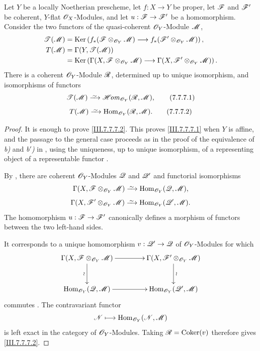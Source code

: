 \begin{corollary}[7.7.7]
\label{III.7.7.7}
Let $Y$ be a locally Noetherian prescheme, let
$f:X\to Y$ be proper, let $\mathscr{F}$ and $\mathscr{F}'$ be
coherent, $Y$-flat $\mathscr{O}_X$-Modules, and let
$u:\mathscr{F}\to\mathscr{F}'$ be a homomorphism.  Consider the two
functors of the quasi-coherent $\mathscr{O}_Y$-Module $\mathscr{M}$,
\begin{align*}
  \mathscr{T}(\mathscr{M})
  &=
  \operatorname{Ker}\left(
    f_*(\mathscr{F}\otimes_{\mathscr{O}_Y}\mathscr{M})
    \longrightarrow
    f_*(\mathscr{F}'\otimes_{\mathscr{O}_Y}\mathscr{M})
  \right),\\
  T(\mathscr{M})
  &=
  \Gamma(Y,\mathscr{T}(\mathscr{M}))\\
  &=
  \operatorname{Ker}\left(
    \Gamma(X,\mathscr{F}\otimes_{\mathscr{O}_Y}\mathscr{M})
    \longrightarrow
    \Gamma(X,\mathscr{F}'\otimes_{\mathscr{O}_Y}\mathscr{M})
  \right).
\end{align*}
There is a coherent $\mathscr{O}_Y$-Module $\mathscr{R}$, determined
up to unique isomorphism, and isomorphisms of functors
\[
  \sh{T}(\sh{M})
  \simto
  \shHom_{\sh{O}_Y}(\sh{R},\sh{M}),
  \tag{7.7.7.1}\label{III.7.7.7.1}
\]
\[
  T(\sh{M})
  \simto
  \Hom_{\sh{O}_Y}(\sh{R},\sh{M}).
  \tag{7.7.7.2}\label{III.7.7.7.2}
\]
\end{corollary}

\begin{proof}
It is enough to prove \eqref{III.7.7.7.2}.  This proves
\eqref{III.7.7.7.1} when $Y$ is affine, and the passage to
the general case proceeds as in the proof of the equivalence
of \emph{b)} and \emph{b$'$)} in , using the uniqueness,
up to unique isomorphism, of a representing object of a
representable functor .

By , there are coherent
$\mathscr{O}_Y$-Modules $\mathscr{Q}$ and $\mathscr{Q}'$ and functorial
isomorphisms
\[
  \Gamma(X,\sh{F}\otimes_{\sh{O}_Y}\sh{M})
  \simto
  \Hom_{\sh{O}_Y}(\sh{Q},\sh{M}),
\]
\[
  \Gamma(X,\sh{F}'\otimes_{\sh{O}_Y}\sh{M})
  \simto
  \Hom_{\sh{O}_Y}(\sh{Q}',\sh{M}).
\]
The homomorphism $u:\mathscr{F}\to\mathscr{F}'$ canonically defines a
morphism of functors between the two left-hand sides.

It corresponds to a unique homomorphism
$v:\mathscr{Q}'\to\mathscr{Q}$ of $\mathscr{O}_Y$-Modules for which
\[
\xymatrix@C=42pt@R=28pt{
  \Gamma(X,\sh{F}\otimes_{\sh{O}_Y}\sh{M})
    \ar[r]\ar[d]_-{\wr}
  &
  \Gamma(X,\sh{F}'\otimes_{\sh{O}_Y}\sh{M})
    \ar[d]^-{\wr}
  \\
  \Hom_{\sh{O}_Y}(\sh{Q},\sh{M})
    \ar[r]
  &
  \Hom_{\sh{O}_Y}(\sh{Q}',\sh{M})
}
\]
commutes .  The contravariant functor
\[
  \mathscr{N}\longmapsto
  \operatorname{Hom}_{\mathscr{O}_Y}(\mathscr{N},\mathscr{M})
\]
is left exact in the category of $\mathscr{O}_Y$-Modules.
Taking $\mathscr{R}=\operatorname{Coker}(v)$ therefore gives
\eqref{III.7.7.7.2}.
\end{proof}

